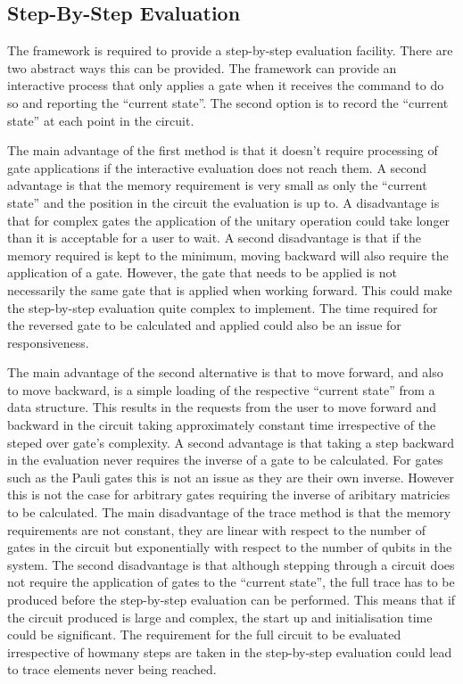 \subsection{Step-By-Step Evaluation}
The framework is required to provide a step-by-step evaluation facility.
There are two abstract ways this can be provided.
The framework can provide an interactive process that only applies a gate when it receives the command to do so and reporting the ``current state''.
The second option is to record the ``current state'' at each point in the circuit.

The main advantage of the first method is that it doesn't require processing of gate applications if the interactive evaluation does not reach them.
A second advantage is that the memory requirement is very small as only the ``current state'' and the position in the circuit the evaluation is up to.
A disadvantage is that for complex gates the application of the unitary operation could take longer than it is acceptable for a user to wait.
A second disadvantage is that if the memory required is kept to the minimum, moving backward will also require the application of a gate.
However, the gate that needs to be applied is not necessarily the same gate that is applied when working forward.
This could make the step-by-step evaluation quite complex to implement.
The time required for the reversed gate to be calculated and applied could also be an issue for responsiveness.

The main advantage of the second alternative is that to move forward, and also to move backward, is a simple loading of the respective ``current state'' from a data structure.
This results in the requests from the user to move forward and backward in the circuit taking approximately constant time irrespective of the steped over gate's complexity.
A second advantage is that taking a step backward in the evaluation never requires the inverse of a gate to be calculated.
For gates such as the Pauli gates this is not an issue as they are their own inverse.
However this is not the case for arbitrary gates requiring the inverse of aribitary matricies to be calculated.
The main disadvantage of the trace method is that the memory requirements are not constant, they are linear with respect to the number of gates in the circuit but exponentially with respect to the number of qubits in the system.
The second disadvantage is that although stepping through a circuit does not require the application of gates to the ``current state'', the full trace has to be produced before the step-by-step evaluation can be performed.
This means that if the circuit produced is large and complex, the start up and initialisation time could be significant.
The requirement for the full circuit to be evaluated irrespective of howmany steps are taken in the step-by-step evaluation could lead to trace elements never being reached.

